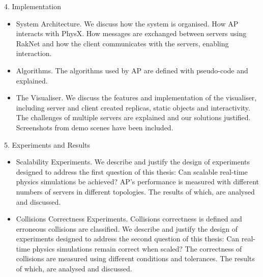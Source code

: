 4. Implementation
\begin{itemize}
	\item System Architecture. We discuss how the system is organised. How AP interacts with PhysX. How messages are exchanged between servers using RakNet and how the client communicates with the servers, enabling interaction.
	\item Algorithms. The algorithms used by AP are defined with pseudo-code and explained.
	\item The Visualiser. We discuss the features and implementation of the visualiser, including server and client created replicas, static objects and interactivity. The challenges of multiple servers are explained and our solutions justified. Screenshots from demo scenes have been included.
\end{itemize}

5. Experiments and Results
\begin{itemize}
	\item Scalability Experiments. We describe and justify the design of experiments designed to address the first question of this thesis: Can scalable real-time physics simulations be achieved? AP's performance is measured with different numbers of servers in different topologies. The results of which, are analysed and discussed.
	\item Collisions Correctness Experiments. Collisions correctness is defined and erroneous collisions are classified. We describe and justify the design of experiments designed to address the second question of this thesis: Can real-time physics simulations remain correct when scaled? The correctness of collisions are measured using different conditions and tolerances. The results of which, are analysed and discussed.
\end{itemize}

